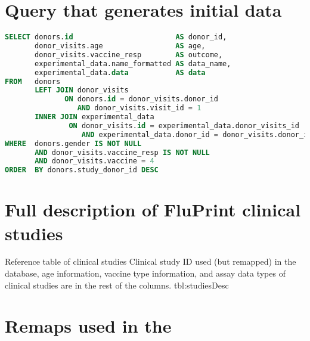 \begin{appendices}
    \section{Query that generates initial \simon data}
\begin{lstlisting}[language=sql, caption=Query of initial SIMON data, label={lst:QueryTemplate}]
SELECT donors.id                        AS donor_id,
       donor_visits.age                 AS age,
       donor_visits.vaccine_resp        AS outcome,
       experimental_data.name_formatted AS data_name,
       experimental_data.data           AS data
FROM   donors
       LEFT JOIN donor_visits
              ON donors.id = donor_visits.donor_id
                 AND donor_visits.visit_id = 1
       INNER JOIN experimental_data
               ON donor_visits.id = experimental_data.donor_visits_id
                  AND experimental_data.donor_id = donor_visits.donor_id
WHERE  donors.gender IS NOT NULL
       AND donor_visits.vaccine_resp IS NOT NULL
       AND donor_visits.vaccine = 4
ORDER  BY donors.study_donor_id DESC
\end{lstlisting}

    \section{Full description of FluPrint clinical studies}
{Reference table of clinical studies}
{Clinical study ID used (but remapped) in the database, age information,
vaccine type information, and assay data types of clinical studies are in the
rest of the columns.}
{tbl:studiesDesc}


    \section{Remaps used in the \flup}


\end{appendices}

